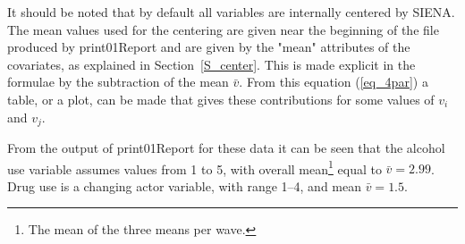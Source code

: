\documentclass[a4paper,fleqn,11pt]{article}
\newcommand{\+}{\, + \,}
\newcommand{\sfn}[1]{\textsf{#1}}
\newcommand{\si}{{\sf SIENA}}
\begin{document}

It should be noted that by default all variables are internally centered by \si.
The mean values used for the centering
are given near the beginning of the file produced by
\sfn{print01Report} and are given by the \textsf{"mean"}
attributes of the covariates, as explained in
Section~\ref{S_center}.
This is made explicit in the formulae by the subtraction
of the mean $\bar v$.
From this equation (\ref{eq_4par}) a table, or a plot, can be made
that gives these contributions for some values of $v_i$ and $v_j$.

From the output of \sfn{print01Report} for these data it can be seen that
the alcohol use variable assumes values from 1 to 5, with overall
mean\footnote{The mean of the three means per wave.}
equal to $\bar v = 2.99$.
Drug use is a changing actor variable, with
range 1--4, and mean $\bar v = 1.5$.
\end{document}
